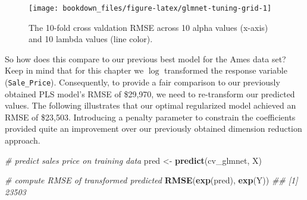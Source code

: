 \documentclass[]{krantz}
\makeatletter
\newenvironment{Shaded}{\begin{snugshade}}{\end{snugshade}}
\newcommand{\CommentTok}[1]{\textcolor[rgb]{0.37,0.37,0.37}{\textit{#1}}}
\newcommand{\DataTypeTok}[1]{\textcolor[rgb]{0.27,0.27,0.27}{#1}}
\newcommand{\DecValTok}[1]{\textcolor[rgb]{0.06,0.06,0.06}{#1}}
\newcommand{\KeywordTok}[1]{\textcolor[rgb]{0.27,0.27,0.27}{\textbf{#1}}}
\newcommand{\NormalTok}[1]{#1}
\newcommand{\OperatorTok}[1]{\textcolor[rgb]{0.43,0.43,0.43}{\textbf{#1}}}
\newcommand{\StringTok}[1]{\textcolor[rgb]{0.5,0.5,0.5}{#1}}
\newenvironment{kframe}{%
\medskip{}
\setlength{\fboxsep}{.8em}
 \def\at@end@of@kframe{}%
 \ifinner\ifhmode%
  \def\at@end@of@kframe{\end{minipage}}%
  \begin{minipage}{\columnwidth}%
 \fi\fi%
 \def\FrameCommand##1{\hskip\@totalleftmargin \hskip-\fboxsep
 \colorbox{shadecolor}{##1}\hskip-\fboxsep
     \hskip-\linewidth \hskip-\@totalleftmargin \hskip\columnwidth}%
 \MakeFramed {\advance\hsize-\width
   \@totalleftmargin\z@ \linewidth\hsize
   \@setminipage}}%
 {\par\unskip\endMakeFramed%
 \at@end@of@kframe}
\renewenvironment{Shaded}{\begin{kframe}}{\end{kframe}}
\makeatother
\begin{document}
\begin{Shaded}
\end{Shaded}

\begin{figure}

{\centering \texttt{[image: bookdown\_files/figure-latex/glmnet-tuning-grid-1]} 

}

\caption{The 10-fold cross valdation RMSE across 10 alpha values (x-axis) and 10 lambda values (line color).}\label{fig:glmnet-tuning-grid}
\end{figure}

So how does this compare to our previous best model for the Ames data set? Keep in mind that for this chapter we \(\log\) transformed the response variable (\texttt{Sale\_Price}). Consequently, to provide a fair comparison to our previously obtained PLS model's RMSE of \$29,970, we need to re-transform our predicted values. The following illustrates that our optimal regularized model achieved an RMSE of \$23,503. Introducing a penalty parameter to constrain the coefficients provided quite an improvement over our previously obtained dimension reduction approach.

\begin{Shaded}
\begin{Highlighting}[]
\CommentTok{# predict sales price on training data}
\NormalTok{pred <-}\StringTok{ }\KeywordTok{predict}\NormalTok{(cv_glmnet, X)}

\CommentTok{# compute RMSE of transformed predicted}
\KeywordTok{RMSE}\NormalTok{(}\KeywordTok{exp}\NormalTok{(pred), }\KeywordTok{exp}\NormalTok{(Y))}
\CommentTok{## [1] 23503}
\end{Highlighting}
\end{Shaded}
\end{document}
